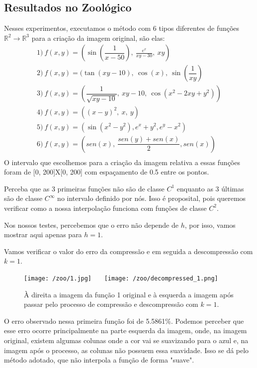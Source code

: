 \documentclass{article}
\begin{document}
		\subsection{Resultados no Zoológico}
		Nesses experimentos, executamos o método com 6 tipos diferentes de funções $\mathbb{R}^2 \rightarrow \mathbb{R}^3$ para a criação da imagem original, são elas:
		\[
			\begin{array}{llllll}
			1)\ f(x, y) = (\sin(\dfrac{1}{x-50}),\ \frac{e^x}{xy - 30},\ xy) \\
			2)\ f(x, y) = (\tan(xy - 10),\ \cos(x),\ \sin(\dfrac{1}{xy}) \\
			3)\ f(x, y) = (\dfrac{1}{\sqrt{xy - 10}},\ xy - 10,\ \cos(x^2 - 2xy + y^2)) \\
			4)\ f(x, y) = ((x - y)^2,\ x,\ y) \\
			5)\ f(x, y) = (\sin(x^2 - y^2), e^x + y^2, e^y - x^2) \\
			6)\ f(x, y) = (sen(x),\ \dfrac{sen(y) + sen(x)}{2}, sen(x)) \\
			\end{array}
		\]
		O intervalo que escolhemos para a criação da imagem relativa a essas funções foram de [0, 200]X[0, 200] com espaçamento de 0.5 entre os pontos. \par
		Perceba que as 3 primeiras funções não são de classe $C^1$ enquanto as 3 últimas são de classe $C^\infty$ no intervalo definido por nós. Isso é proposital, pois queremos verificar como a nossa interpolação funciona com funções de classe $C^2$. \par
		Nos nossos testes, percebemos que o erro não depende de $h$, por isso, vamos mostrar aqui apenas para $h = 1$. \par
		Vamos verificar o valor do erro da compressão e em seguida a descompressão com $k = 1$.
		\pagebreak
		\begin{figure}[H]
			\centering
			\captionsetup{justification=centering}
			\texttt{[image: /zoo/1.jpg]} \ \ \
			\texttt{[image: /zoo/decompressed\_1.png]} \\
			\caption{À direita a imagem da função 1 original e à esquerda a imagem após passar pelo processo de compressão e descompressão com $k = 1$.}  
			
		\end{figure}\par
		O erro observado nessa primeira função foi de 5.5861\%. Podemos perceber que esse erro ocorre principalmente na parte esquerda da imagem, onde, na imagem original, existem algumas colunas onde a cor vai se suavizando para o azul e, na imagem após o processo, as colunas não possuem essa suavidade. Isso se dá pelo método adotado, que não interpola a função de forma "suave".
		
\end{document}
